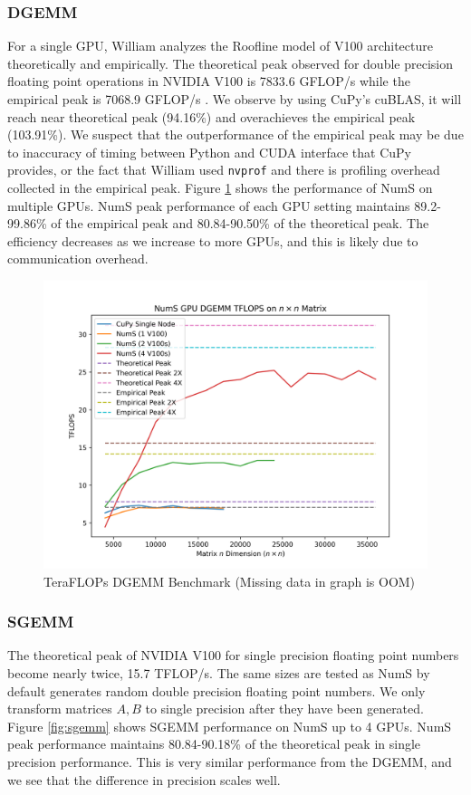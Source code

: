 \documentclass{article}
\begin{document}
\subsubsection{DGEMM}
For a single GPU, William analyzes the Roofline model of V100 architecture theoretically and empirically. The theoretical peak observed for double precision floating point operations in NVIDIA V100 is 7833.6 GFLOP/s while the empirical peak is 7068.9 GFLOP/s \cite{roofline}. We observe by using CuPy's cuBLAS, it will reach near theoretical peak (94.16\%) and overachieves the empirical peak (103.91\%). We suspect that the outperformance of the empirical peak may be due to inaccuracy of timing between Python and CUDA interface that CuPy provides, or the fact that William used \verb|nvprof| and there is profiling overhead collected in the empirical peak. Figure \ref{fig:dgemm} shows the performance of NumS on multiple GPUs. NumS peak performance of each GPU setting maintains 89.2-99.86\% of the empirical peak and 80.84-90.50\% of the theoretical peak. The efficiency decreases as we increase to more GPUs, and this is likely due to communication overhead.

\begin{figure}
  \centerline{\includegraphics[width=5in]{figures/NumS_GPU_TFLOPS_DGEMM.png}}
  \caption{TeraFLOPs DGEMM Benchmark (Missing data in graph is OOM)}
  \label{fig:dgemm}
\end{figure}

\subsubsection{SGEMM}
The theoretical peak of NVIDIA V100 for single precision floating point numbers become nearly twice, 15.7 TFLOP/s. The same sizes are tested as NumS by default generates random double precision floating point numbers. We only transform matrices $A, B$ to single precision after they have been generated. Figure \ref{fig:sgemm} shows SGEMM performance on NumS up to 4 GPUs. NumS peak performance maintains 80.84-90.18\% of the theoretical peak in single precision performance. This is very similar performance from the DGEMM, and we see that the difference in precision scales well.
\end{document}
